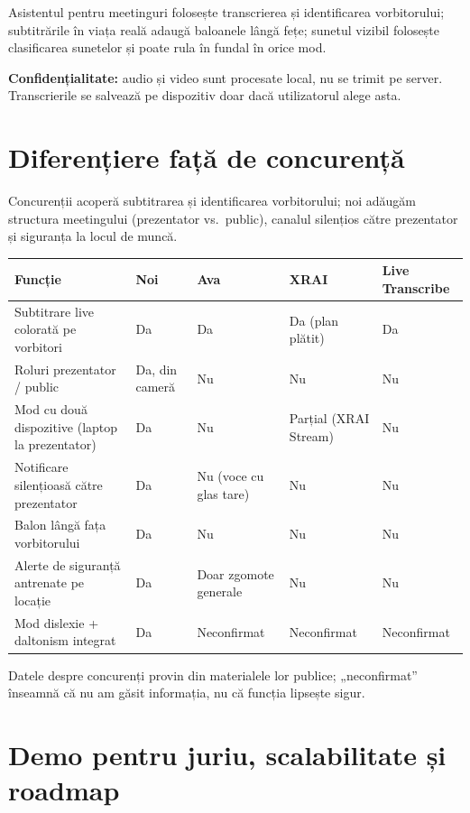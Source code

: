 \documentclass[11pt,a4paper]{article}
\begin{document}
Asistentul pentru meetinguri folosește transcrierea și identificarea vorbitorului; subtitrările în viața reală adaugă baloanele lângă fețe; sunetul vizibil folosește clasificarea sunetelor și poate rula în fundal în orice mod.

\textbf{Confidențialitate:} audio și video sunt procesate local, nu se trimit pe server. Transcrierile se salvează pe dispozitiv doar dacă utilizatorul alege asta.

\section*{Diferențiere față de concurență}

Concurenții acoperă subtitrarea și identificarea vorbitorului; noi adăugăm structura meetingului (prezentator vs.\ public), canalul silențios către prezentator și siguranța la locul de muncă.

\begin{center}
\small
\begin{tabularx}{\textwidth}{>{\raggedright\arraybackslash}p{4.3cm} L L L L}
\toprule
\textbf{Funcție} & \textbf{Noi} & \textbf{Ava} & \textbf{XRAI} & \textbf{Live Transcribe} \\
\midrule
Subtitrare live colorată pe vorbitori & Da & Da & Da (plan plătit) & Da \\
Roluri prezentator / public & Da, din cameră & Nu & Nu & Nu \\
Mod cu două dispozitive (laptop la prezentator) & Da & Nu & Parțial (XRAI Stream) & Nu \\
Notificare silențioasă către prezentator & Da & Nu (voce cu glas tare) & Nu & Nu \\
Balon lângă fața vorbitorului & Da & Nu & Nu & Nu \\
Alerte de siguranță antrenate pe locație & Da & Doar zgomote generale & Nu & Nu \\
Mod dislexie + daltonism integrat & Da & Neconfirmat & Neconfirmat & Neconfirmat \\
\bottomrule
\end{tabularx}
\end{center}

{\small\color{quiet} Datele despre concurenți provin din materialele lor publice; „neconfirmat” înseamnă că nu am găsit informația, nu că funcția lipsește sigur.}

\section*{Demo pentru juriu, scalabilitate și roadmap}
\end{document}
